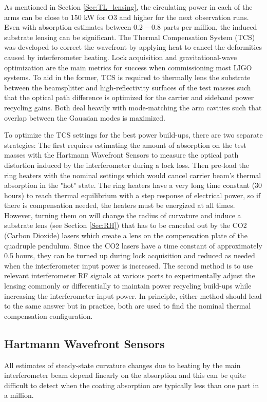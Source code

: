 	As mentioned in Section \ref{Sec:TL_lensing}, the circulating power in each of the arms can be close to 150 kW for O3 and higher for the next observation runs.  Even with absorption estimates between $0.2-0.8$ parts per million, the induced substrate lensing can be significant.  The Thermal Compensation System (TCS) \cite{Lawrence_TCS} \cite{AWC_current} \cite{winkler_thermaldist} \cite{Strain_TL} was developed to correct the wavefront by applying heat to cancel the deformities caused by interferometer heating.  Lock acquisition and gravitational-wave optimization are the main metrics for success when commissioning most LIGO systems.  To aid in the former, TCS is required to thermally lens the substrate between the beamsplitter and high-reflectivity surfaces of the test masses such that the optical path difference is optimized for the carrier and sideband power recycling gains.  Both deal heavily with mode-matching the arm cavities such that overlap between the Gaussian modes is maximized.
	
	To optimize the TCS settings for the best power build-ups, there are two separate strategies:  The first requires estimating the amount of absorption on the test masses with the Hartmann Wavefront Sensors to measure the optical path distortion induced by the interferometer during a lock loss.  Then pre-load the ring heaters with the nominal settings which would cancel carrier beam's thermal absorption in the "hot" state.  The ring heaters have a very long time constant (30 hours) to reach thermal equilibrium with a step response of electrical power, so if there is compensation needed, the heaters must be energized at all times.    However, turning them on will change the radius of curvature and induce a substrate lens (see Section \ref{Sec:RH}) that has to be canceled out by the CO2 (Carbon Dioxide) lasers which create a lens on the compensation plate of the quadruple pendulum.  Since the CO2 lasers have a time constant of approximately 0.5 hours, they can be turned up during lock acquisition and reduced as needed when the interferometer input power is increased. The second method is to use relevant interferometer RF signals at various ports to experimentally adjust the lensing commonly or differentially to maintain power recycling build-ups while increasing the interferometer input power.  In principle, either method should lead to the same answer but in practice, both are used to find the nominal thermal compensation configuration.
	\subsection{Hartmann Wavefront Sensors}\label{Sec:HWS}
	All estimates of steady-state curvature changes due to heating by the main interferometer beam depend linearly on the absorption and this can be quite difficult to detect when the coating absorption are typically less than one part in a million.
	
